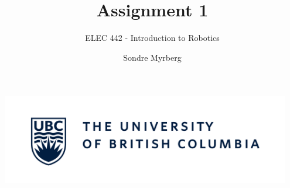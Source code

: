 \documentclass[a4paper]{scrartcl}
\title{Assignment 1}
\subtitle{ELEC 442 - Introduction to Robotics}
\author{Sondre Myrberg}
\begin{document}
\hypersetup{pageanchor=false}
\begin{titlepage}
    \maketitle
    \vfill
    \vfill
    \vfill
    \vfill
    \includegraphics[width=0.95\textwidth]{../../ubc_logo.pdf}
    \vfill
    \vfill
\end{titlepage}
\hypersetup{pageanchor=true}

\section{}  
\end{document}
